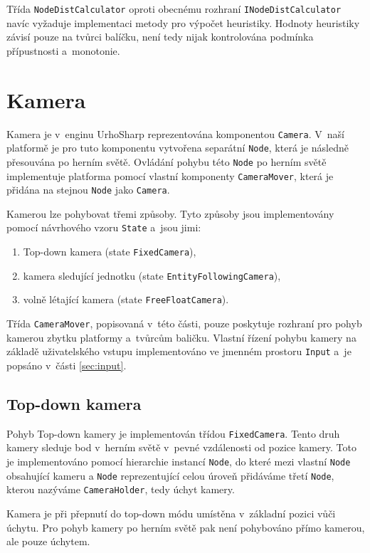 Třída \texttt{NodeDistCalculator} oproti obecnému rozhraní \texttt{INodeDistCalculator} navíc vyžaduje implementaci metody pro výpočet heuristiky. Hodnoty heuristiky závisí pouze na tvůrci balíčku, není tedy nijak kontrolována podmínka přípustnosti a~monotonie.

\section{Kamera}
\label{sec:camera}
Kamera je v~enginu UrhoSharp reprezentována komponentou \texttt{Camera}. V~naší platformě je pro tuto komponentu vytvořena separátní \texttt{Node}, která je následně přesouvána po herním světě. Ovládání pohybu této \texttt{Node} po herním světě implementuje platforma pomocí vlastní komponenty \texttt{CameraMover}, která je přidána na stejnou \texttt{Node} jako \texttt{Camera}.

Kamerou lze pohybovat třemi způsoby. Tyto způsoby jsou implementovány pomocí návrhového vzoru \texttt{State} \citep[str.~305]{book:gangoffour} a~jsou jimi:
\begin{enumerate}
	\item Top-down kamera (state \texttt{FixedCamera}),
	\item kamera sledující jednotku (state \texttt{EntityFollowingCamera}),
	\item volně létající kamera (state \texttt{FreeFloatCamera}).

\end{enumerate}

Třída \texttt{CameraMover}, popisovaná v~této části, pouze poskytuje rozhraní pro pohyb kamerou zbytku platformy a~tvůrcům baličku. Vlastní řízení pohybu kamery na základě uživatelského vstupu implementováno ve jmenném prostoru \texttt{Input} a~je popsáno v~části \ref{sec:input}. 

\subsection{Top-down kamera}
Pohyb Top-down kamery je implementován třídou \texttt{FixedCamera}. Tento druh kamery sleduje bod v~herním světě v~pevné vzdálenosti od pozice kamery. Toto je implementováno pomocí hierarchie instancí \texttt{Node}, do které mezi vlastní \texttt{Node} obsahující kameru a \texttt{Node} reprezentující celou úroveň přidáváme třetí \texttt{Node}, kterou nazýváme \texttt{CameraHolder}, tedy úchyt kamery. 

Kamera je při přepnutí do top-down módu umístěna v~základní pozici vůči úchytu. Pro pohyb kamery po herním světě pak není pohybováno přímo kamerou, ale pouze úchytem.

